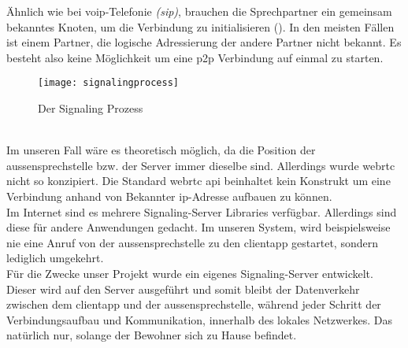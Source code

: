 Ähnlich wie bei \gls{voip}-Telefonie \textit{(\gls{sip})}, brauchen die Sprechpartner ein gemeinsam bekanntes Knoten, um die Verbindung zu initialisieren (). In den meisten Fällen ist einem Partner, die logische Adressierung der andere Partner nicht bekannt. Es besteht also keine Möglichkeit um eine \gls{p2p} Verbindung auf einmal zu starten.
\begin{figure}[htb!]
	\begin{center}
		\texttt{[image: signalingprocess]}
		\caption[Der Signaling Prozess]{Der Signaling Prozess}
		\label{fig:signaling}
	\end{center}
\end{figure}
\\
Im unseren Fall wäre es theoretisch möglich, da die Position der \gls{aussensprechstelle} bzw. der Server immer dieselbe sind. Allerdings wurde \gls{webrtc} nicht so konzipiert. Die Standard \gls{webrtc} \gls{api} beinhaltet kein Konstrukt um eine Verbindung anhand von Bekannter \gls{ip}-Adresse aufbauen zu können.
\\
Im Internet sind es mehrere Signaling-Server Libraries verfügbar. Allerdings sind diese für andere Anwendungen gedacht. Im unseren System, wird beispielsweise nie eine Anruf von der \gls{aussensprechstelle} zu den \gls{clientapp} gestartet, sondern lediglich umgekehrt.
\\
Für die Zwecke unser Projekt wurde ein eigenes Signaling-Server entwickelt. Dieser wird auf den Server ausgeführt und somit bleibt der Datenverkehr zwischen dem \gls{clientapp} und der \gls{aussensprechstelle}, während jeder Schritt der Verbindungsaufbau und Kommunikation, innerhalb des lokales Netzwerkes. Das natürlich nur, solange der Bewohner sich zu Hause befindet.

